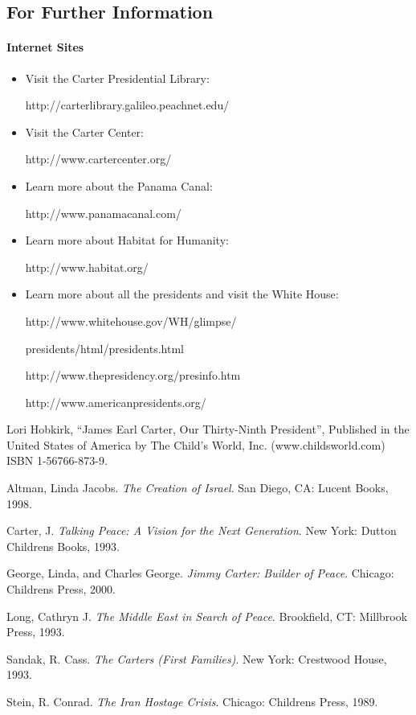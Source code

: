 \documentclass{article}
\begin{document}
\subsection*{For Further Information}
\paragraph{Internet Sites}
\begin{itemize}
\item Visit the Carter Presidential Library:\par
http://carterlibrary.galileo.peachnet.edu/
\item Visit the Carter Center:\par
http://www.cartercenter.org/
\item Learn more about the Panama Canal:\par
http://www.panamacanal.com/
\item Learn more about Habitat for Humanity:\par
http://www.habitat.org/
\item Learn more about all the presidents and visit the White House:\par
http://www.whitehouse.gov/WH/glimpse/\par
presidents/html/presidents.html\par
http://www.thepresidency.org/presinfo.htm\par
http://www.americanpresidents.org/
\end{itemize}

\begin{thebibliography}{9} 

 Lori Hobkirk, ``James Earl Carter, Our Thirty-Ninth President'', Published in the United States of America by The Child's World, Inc. (www.childsworld.com) ISBN 1-56766-873-9.

\bigskip
{} Altman, Linda Jacobs. {\it The Creation of Israel}. San Diego, CA: Lucent Books, 1998.

 Carter, J. {\it Talking Peace: A Vision for the Next Generation}. New York: Dutton Childrens Books, 1993.

 George, Linda, and Charles George. {\it Jimmy Carter: Builder of Peace}. Chicago: Childrens Press, 2000.

 Long, Cathryn J. {\it The Middle East in Search of Peace}. Brookfield, CT: Millbrook Press, 1993.

 Sandak, R. Cass. {\it The Carters {\em (First Families)}}. New York: Crestwood House, 1993.

 Stein, R. Conrad. {\it The Iran Hostage Crisis}. Chicago: Childrens Press, 1989. 
\end{thebibliography}
\end{document}
